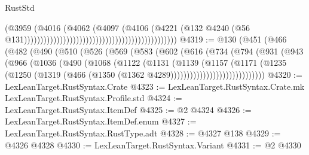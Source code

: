 \begin{lexlean}{RustStd}
\begin{coremodule}
                                                                                  (@3959
                                                                                    (@4016
                                                                                      (@4062
                                                                                        (@4097
                                                                                          (@4106
                                                                                            (@4221
                                                                                              (@132
                                                                                                @4240
                                                                                                (@56
                                                                                                  @131)))))))))))))))))))))))))))))))))))))))))))))))
@4319 := @130
    (@451
      (@466
        (@482
          (@490
            (@510
              (@526
                (@569
                  (@583
                    (@602
                      (@616
                        (@734
                          (@794
                            (@931
                              (@943
                                (@966
                                  (@1036
                                    (@490
                                      (@1068
                                        (@1122
                                          (@1131
                                            (@1139
                                              (@1157
                                                (@1171
                                                  (@1235
                                                    (@1250
                                                      (@1319
                                                        (@466
                                                          (@1350
                                                            (@1362
                                                              @4289)))))))))))))))))))))))))))))
@4320 := LexLeanTarget.RustSyntax.Crate
@4323 := LexLeanTarget.RustSyntax.Crate.mk LexLeanTarget.RustSyntax.Profile.std
@4324 := LexLeanTarget.RustSyntax.ItemDef
@4325 := @2 @4324
@4326 := LexLeanTarget.RustSyntax.ItemDef.enum
@4327 := LexLeanTarget.RustSyntax.RustType.adt
@4328 := @4327 @138
@4329 := @4326 @4328
@4330 := LexLeanTarget.RustSyntax.Variant
@4331 := @2 @4330

\end{coremodule}
\end{lexlean}
